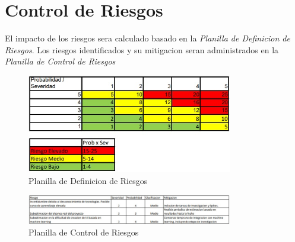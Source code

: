 \documentclass[a4paper]{article}
\begin{document}



\appendix
\section{Control de Riesgos}
\label{anexo:control-de-riesgos}

El impacto de los riesgos sera calculado basado en la \textit{Planilla de Definicion de Riesgos}. Los riesgos identificados y su mitigacion seran administrados en la \textit{Planilla de Control de Riesgos}

\begin{figure}[ht]
    \centering
    \includegraphics[width=0.8\textwidth]{./images/risk-definition.jpg}
    \caption{Planilla de Definicion de Riesgos}
    \label{fig:rd}
\end{figure}

\begin{figure}[ht]
    \centering
    \includegraphics[width=0.8\textwidth]{./images/risk-management.jpg}
    \caption{Planilla de Control de Riesgos}
    \label{fig:rc}
\end{figure}
\end{document}

